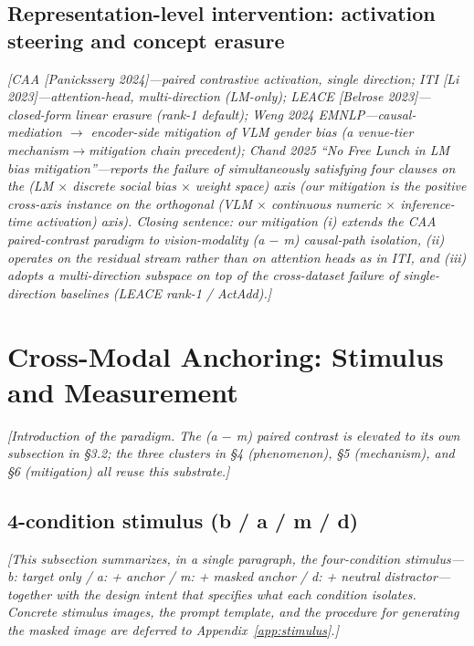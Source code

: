 \documentclass[11pt]{article}
\newcommand{\todoNote}[1]{\textit{\textcolor[rgb]{0.45,0.45,0.45}{[#1]}}}
\begin{document}
\subsection{Representation-level intervention: activation steering and concept erasure}
\todoNote{CAA [Panickssery 2024]---paired contrastive activation, single direction; ITI [Li 2023]---attention-head, multi-direction (LM-only); LEACE [Belrose 2023]---closed-form linear erasure (rank-1 default); Weng 2024 EMNLP---causal-mediation $\rightarrow$ encoder-side mitigation of VLM gender bias (a venue-tier mechanism$\rightarrow$mitigation chain precedent); Chand 2025 ``No Free Lunch in LM bias mitigation''---reports the \textit{failure} of simultaneously satisfying four clauses on the (LM $\times$ discrete social bias $\times$ weight space) axis (our mitigation is the positive cross-axis instance on the orthogonal (VLM $\times$ continuous numeric $\times$ inference-time activation) axis). Closing sentence: our mitigation (i) extends the CAA paired-contrast paradigm to \textit{vision-modality (a $-$ m) causal-path isolation}, (ii) operates on the \textit{residual stream} rather than on attention heads as in ITI, and (iii) adopts a \textit{multi-direction subspace} on top of the cross-dataset failure of single-direction baselines (LEACE rank-1 / ActAdd).}

\section{Cross-Modal Anchoring: Stimulus and Measurement}
\todoNote{Introduction of the paradigm. The (a $-$ m) paired contrast is elevated to its own subsection in \S3.2; the three clusters in \S4 (phenomenon), \S5 (mechanism), and \S6 (mitigation) all reuse this substrate.}

\subsection{4-condition stimulus (b / a / m / d)}
\todoNote{This subsection summarizes, in a single paragraph, the four-condition stimulus---b: target only / a: + anchor / m: + masked anchor / d: + neutral distractor---together with the design intent that specifies what each condition isolates. Concrete stimulus images, the prompt template, and the procedure for generating the masked image are deferred to Appendix~\ref{app:stimulus}.}
\end{document}
